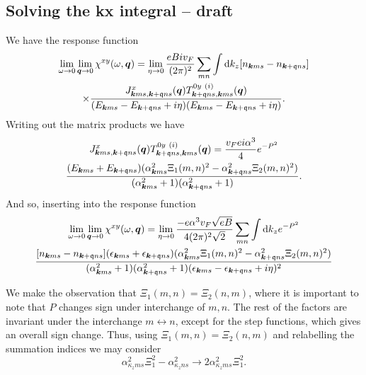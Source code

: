 \subsection{Solving the kx integral -- draft}
\label{sec:perptiltsum}
We have the response function
\begin{multline*}
  \lim_{\omega \to 0} \lim_{\bm{q} \to 0} \chi^{xy}(\omega, \bm{q}) = \lim_{\eta \to 0}
  \frac{e B i v_F}{(2 \pi)^2}
  \sum\limits_{mn}^{} \int \mathrm{d}k_z [n_{\bm{k} m s} - n_{\bm{k}+\mathfrak{q} n s}]\\
  \times \frac{
    J^x_{\bm{k} m s, \bm{k} + \mathfrak{q} ns} (\bm{q}) T^{0y~(i)}_{\bm{k}+\mathfrak{q} n s, \bm{k}ms}(\bm{q})
  }{
    (E_{\bm{k} m s} - E_{\bm{k}+\mathfrak{q} ns} + i \eta)(E_{\bm{k}ms}-E_{\bm{k}+\mathfrak{q} ns} + i \eta)
  }.
\end{multline*}
Writing out the matrix products we have
\begin{multline}
  J^x_{\bm{k} m s, \bm{k} + \mathfrak{q} ns} (\bm{q}) T^{0y~(i)}_{\bm{k}+\mathfrak{q} n s, \bm{k}ms}(\bm{q})
  =
  \frac{v_F e i \alpha^{3}}{4}
  e^{-P^2}\\
  \frac{
    (E_{\bm{k} m s} + E_{\bm{k}+\mathfrak{q} n s})
    (\alpha_{\bm{k} m s}^2 \Xi_1(m,n)^2 - \alpha_{\bm{k} + \mathfrak{q} n s}^2 \Xi_2(m,n)^2)
  }{
    (\alpha_{\bm{k} m s}^2 + 1)(\alpha_{\bm{k}+\mathfrak{q} n s}^2 + 1)
  }.
  \label{eq:100}
\end{multline}
And so, inserting into the response function
\begin{multline}
  \label{eq:101}
  \lim_{\omega \to 0} \lim_{\bm{q} \to 0} \chi^{xy}(\omega, \bm{q}) = \lim_{\eta \to 0}
  \frac{- e \alpha^3 v_F \sqrt{e B} }{4 (2 \pi)^2 \sqrt{2} }
  \sum\limits_{mn}^{}
  \int \mathrm{d}k_z
  e^{-P^2}\\
  \frac{
    [n_{\bm{k} m s} - n_{\bm{k}+\mathfrak{q} n s}]
    (\epsilon_{\bm{k} m s} + \epsilon_{\bm{k}+\mathfrak{q} n s})
    (\alpha_{\bm{k} m s}^2 \Xi_1(m,n)^2 - \alpha_{\bm{k} + \mathfrak{q} n s}^2 \Xi_2(m,n)^2)
  }{
    (\alpha_{\bm{k} m s}^2 + 1)(\alpha_{\bm{k}+\mathfrak{q} n s}^2 + 1)
    (\epsilon_{\bm{k} m s} - \epsilon_{\bm{k}+\mathfrak{q} ns} + i \eta)^2
  }
\end{multline}

We make the observation that \( \Xi _1(m, n) = \Xi _2(n, m) \), where it is important to note that \( P \) changes sign under interchange of \( m,n \).
The rest of the factors are invariant under the interchange \( m \leftrightarrow n \), except for the step functions, which gives an overall sign change.
Thus, using \( \Xi _1(m, n) = \Xi _2(n, m) \) and relabelling the summation indices we may consider
\[
  \alpha_{\kappa_z m s}^2 \Xi_1^2 - \alpha_{\kappa_z n s}^2 \to 2 \alpha_{\kappa_z m s}^2 \Xi_1^2.
\]


